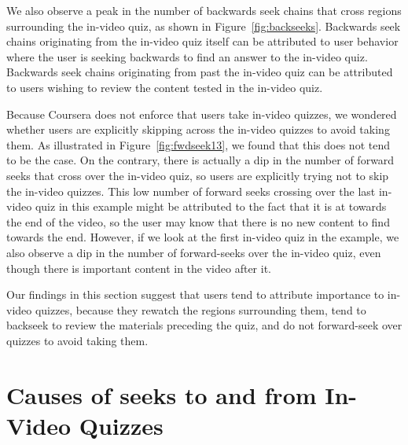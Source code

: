 \documentclass[letterpaper]{article}
\begin{document}
We also observe a peak in the number of backwards seek chains that cross regions surrounding the in-video quiz, as shown in Figure~\ref{fig:backseeks}. Backwards seek chains originating from the in-video quiz itself can be attributed to user behavior where the user is seeking backwards to find an answer to the in-video quiz. Backwards seek chains originating from past the in-video quiz can be attributed to users wishing to review the content tested in the in-video quiz.

Because Coursera does not enforce that users take in-video quizzes, we wondered whether users are explicitly skipping across the in-video quizzes to avoid taking them. As illustrated in Figure~\ref{fig:fwdseek13}, we found that this does not tend to be the case. On the contrary, there is actually a dip in the number of forward seeks that cross over the in-video quiz, so users are explicitly trying not to skip the in-video quizzes. This low number of forward seeks crossing over the last in-video quiz in this example might be attributed to the fact that it is at towards the end of the video, so the user may know that there is no new content to find towards the end. However, if we look at the first in-video quiz in the example, we also observe a dip in the number of forward-seeks over the in-video quiz, even though there is important content in the video after it.

Our findings in this section suggest that users tend to attribute importance to in-video quizzes, because they rewatch the regions surrounding them, tend to backseek to review the materials preceding the quiz, and do not forward-seek over quizzes to avoid taking them.

\section{Causes of seeks to and from In-Video Quizzes}
\end{document}
